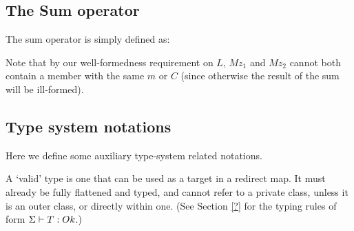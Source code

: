 \subsection{The Sum operator}
The sum operator is simply defined as:

\begin{defs}
{}
{}
\end{defs}
Note that by our well-formedness requirement on $L$, $Mz_1$ and $Mz_2$ cannot both contain a member with the same $m$ or $C$ (since otherwise the result of the sum will be ill-formed).

\subsection{Type system notations}
Here we define some auxiliary type-system related notations.

A `valid' type is one that can be used as a target in a redirect map. It must already be fully flattened and typed, and cannot refer to a private class, unless it is an outer class, or directly within one. (See Section \ref{?} for the typing rules of form $\Sigma \vdash T : {Ok}$.)

\begin{defs}
	
\end{defs}


